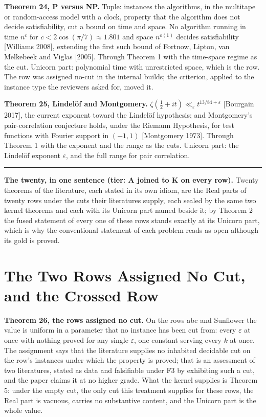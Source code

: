 \documentclass[10pt,twocolumn]{article}
\newenvironment{jbox}{\par\vspace{2pt}\noindent\color{accent}\rule{\columnwidth}{0.8pt}\par\vspace{-2pt}\small}{\par\vspace{2pt}}
\begin{document}
\textbf{Theorem 24, P versus NP.} Tuple: instances the algorithms, in
the multitape or random-access model with a clock, property that the
algorithm does not decide satisfiability, cut a bound on time and space.
No algorithm running in time \(n^{c}\) for
\(c < 2\cos(\pi/7) \approx 1.801\) and space \(n^{o(1)}\) decides
satisfiability {[}Williams 2008{]}, extending the first such bound of
Fortnow, Lipton, van Melkebeek and Viglas {[}2005{]}. Through Theorem 1
with the time-space regime as the cut. Unicorn part: polynomial time
with unrestricted space, which is the row. The row was assigned no-cut
in the internal builds; the criterion, applied to the instance type the
reviewers asked for, moved it.

\textbf{Theorem 25, Lindelöf and Montgomery.}
\(\zeta(\tfrac12 + it) \ll_\varepsilon t^{13/84 + \varepsilon}\)
{[}Bourgain 2017{]}, the current exponent toward the Lindelöf
hypothesis; and Montgomery's pair-correlation conjecture holds, under
the Riemann Hypothesis, for test functions with Fourier support in
\((-1, 1)\) {[}Montgomery 1973{]}. Through Theorem 1 with the exponent
and the range as the cuts. Unicorn part: the Lindelöf exponent
\(\varepsilon\), and the full range for pair correlation.

\begin{jbox}
\textbf{The twenty, in one sentence (tier: A joined to K on every row).} Twenty theorems of the literature, each stated in its own idiom, are the Real parts of twenty rows under the cuts their literatures supply, each sealed by the same two kernel theorems and each with its Unicorn part named beside it; by Theorem 2 the fused statement of every one of these rows stands exactly at its Unicorn part, which is why the conventional statement of each problem reads as open although its gold is proved.
\end{jbox}

\hypertarget{the-two-rows-assigned-no-cut-and-the-crossed-row}{%
\section{The Two Rows Assigned No Cut, and the Crossed
Row}\label{the-two-rows-assigned-no-cut-and-the-crossed-row}}

\textbf{Theorem 26, the rows assigned no cut.} On the rows abc and
Sunflower the value is uniform in a parameter that no instance has been
cut from: every \(\varepsilon\) at once with nothing proved for any
single \(\varepsilon\), one constant serving every \(k\) at once. The
assignment says that the literature supplies no inhabited decidable cut
on the row's instances under which the property is proved; that is an
assessment of two literatures, stated as data and falsifiable under F3
by exhibiting such a cut, and the paper claims it at no higher grade.
What the kernel supplies is Theorem 5: under the empty cut, the only cut
this treatment supplies for these rows, the Real part is vacuous,
carries no substantive content, and the Unicorn part is the whole value.
\end{document}
